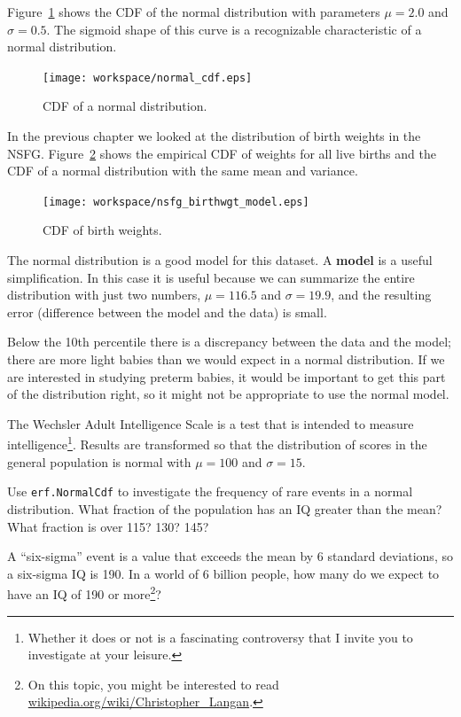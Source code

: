 \documentclass[12pt]{book}
\begin{document}
Figure~\ref{normal_cdf} shows the CDF of the normal distribution
with parameters $\mu=2.0$ and $\sigma=0.5$.  The sigmoid shape of
this curve is a recognizable characteristic of a normal distribution.

\begin{figure}
\centerline{\texttt{[image: workspace/normal\_cdf.eps]}}
\caption{CDF of a normal distribution.}
\label{normal_cdf}
\end{figure}

In the previous chapter we looked at the distribution of birth
weights in the NSFG.  Figure~\ref{nsfg_birthwgt_model} shows the
empirical CDF of weights for all live births and the CDF of
a normal distribution with the same mean and variance.

\begin{figure}
\centerline{\texttt{[image: workspace/nsfg\_birthwgt\_model.eps]}}
\caption{CDF of birth weights.}
\label{nsfg_birthwgt_model}
\end{figure}

The normal distribution is a good model for this dataset.  A {\bf
  model} is a useful simplification.  In this case it is useful
because we can summarize the entire distribution with just two
numbers, $\mu=116.5$ and $\sigma=19.9$, and the resulting error
(difference between the model and the data) is small.

Below the 10th percentile there is a discrepancy between the data
and the model; there are more light babies than we would expect in
a normal distribution.  If we are interested in studying preterm
babies, it would be important to get this part of the distribution
right, so it might not be appropriate to use the normal
model.

\begin{ex}

The Wechsler Adult Intelligence Scale is a test that is intended
to measure intelligence\footnote{Whether it does or not is a
fascinating controversy that I invite you to investigate at your
leisure.}.  Results are transformed so that the distribution of scores
in the general population is normal with $\mu=100$ and $\sigma=15$.

Use {\tt erf.NormalCdf} to investigate the frequency of rare events
in a normal distribution.
What fraction of the population has an IQ greater than the mean?
What fraction is over 115?  130?  145?

A ``six-sigma'' event is a value that exceeds the mean by 6 standard
deviations, so a six-sigma IQ is 190.  In a world of 6 billion people,
how many do we expect to have an IQ of 190 or more\footnote{On this
  topic, you might be interested to read
  \url{wikipedia.org/wiki/Christopher_Langan}.}?

\end{ex}
\end{document}
